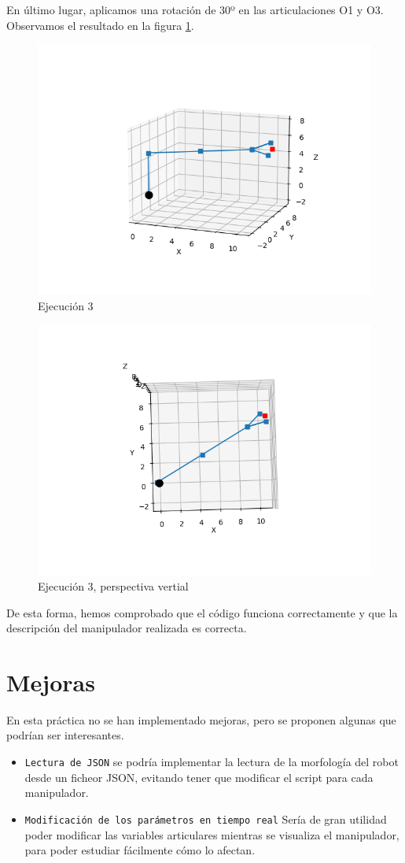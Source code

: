 En último lugar, aplicamos una rotación de 30º en las articulaciones O1 y O3. Observamos el resultado en la figura \ref{chapter:ejecucion3a}.
\begin{figure}[htb]
   \centering
   \includegraphics[width=0.8\linewidth]{images/cin_dir_7.png}
   \caption{Ejecución 3}
   \label{chapter:ejecucion3a}
\end{figure}
\begin{figure}[htb]
   \centering
   \includegraphics[width=0.8\linewidth]{images/cin_dir_8.png}
   \caption{Ejecución 3, perspectiva vertial}
   \label{chapter:ejecucion3b}
\end{figure}

De esta forma, hemos comprobado que el código funciona correctamente y que la descripción del manipulador realizada es correcta.

\section{Mejoras}
En esta práctica no se han implementado mejoras, pero se proponen algunas que podrían ser interesantes.
\begin{itemize}
   \item \texttt{Lectura de JSON} se podría implementar la lectura de la morfología del robot desde un ficheor JSON, evitando tener que modificar el script para cada manipulador.
   \item \texttt{Modificación de los parámetros en tiempo real} Sería de gran utilidad poder modificar las variables articulares mientras se visualiza el manipulador, para poder estudiar fácilmente cómo lo afectan.
\end{itemize}

